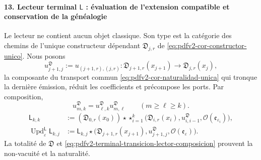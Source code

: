 \paragraph{13. Lecteur terminal \(\mathsf L\) : évaluation de l'extension compatible et conservation de la généalogie}
Le lecteur ne contient aucun objet classique. Son type est la catégorie des chemins de l'unique constructeur dépendant \(\mathfrak D_{j,r}\) de \eqref{eq:pdfv2-cor-constructor-unico}. Nous posons
\begin{equation}
\label{eq:pdfv2-terminal-transicion-lector-tipado}
 u^{\mathfrak D}_{j+1,j}
 :=u_{(j+1,r),(j,r)}:
 \mathfrak D_{j+1,r}(x_{j+1})
 \longrightarrow\mathfrak D_{j,r}(x_j),
\end{equation}
la composante du transport commun \eqref{eq:pdfv2-cor-naturalidad-unica} qui tronque la dernière émission, réduit les coefficients et précompose les ports. Par composition,
\begin{equation}
\label{eq:pdfv2-terminal-transicion-lector-composicion}
 u^{\mathfrak D}_{m,k}
 =u^{\mathfrak D}_{\ell,k}u^{\mathfrak D}_{m,\ell}
 \qquad(m\geq\ell\geq k).
\end{equation}
\begin{align}
 \mathsf L_{k,k}
 &:=(\mathfrak D_{0,r}(x_0))\star
 \mathop{\star}_{i=1}^{k}
 \bigl(\mathfrak D_{i,r}(x_i),u^{\mathfrak D}_{i,i-1},
       \mathcal O(\mathfrak e_{\varepsilon_i})\bigr),
 \label{eq:pdfv2-terminal-semilla-l}\\
 \operatorname{Upd}^{\mathsf L}_{\varepsilon}\mathsf L_{k,j}
 &:=
 \mathsf L_{k,j}\star
 \bigl(\mathfrak D_{j+1,r}(x_{j+1}),
 u^{\mathfrak D}_{j+1,j},\mathcal O(\mathfrak e_\varepsilon)\bigr).
 \label{eq:pdfv2-terminal-update-l}
\end{align}
La totalité de \(\mathfrak D\) et \eqref{eq:pdfv2-terminal-transicion-lector-composicion} prouvent la non-vacuité et la naturalité.

